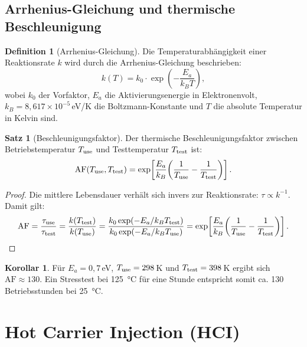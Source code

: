 ﻿\documentclass[a4paper,12pt]{article}
\theoremstyle{definition}
\newtheorem{definition}{Definition}
\newtheorem{satz}{Satz}
\newtheorem{korollar}{Korollar}
\begin{document}
\subsection{Arrhenius-Gleichung und thermische Beschleunigung}

\begin{definition}[Arrhenius-Gleichung]
	Die Temperaturabhängigkeit einer Reaktionsrate $k$ wird durch die
	Arrhenius-Gleichung beschrieben:
	\[
	k(T) = k_0 \cdot \exp\!\left(-\frac{E_a}{k_B T}\right),
	\]
	wobei $k_0$ der Vorfaktor, $E_a$ die Aktivierungsenergie in Elektronenvolt,
	$k_B = 8{,}617 \times 10^{-5}$\,eV/K die Boltzmann-Konstante und
	$T$ die absolute Temperatur in Kelvin sind.
\end{definition}

\begin{satz}[Beschleunigungsfaktor]
	\label{satz:af}
	Der thermische Beschleunigungsfaktor zwischen Betriebstemperatur $T_{\rm use}$
	und Testtemperatur $T_{\rm test}$ ist:
	\[
	\mathrm{AF}(T_{\rm use}, T_{\rm test}) = \exp\!\left[
	\frac{E_a}{k_B}\!\left(\frac{1}{T_{\rm use}} - \frac{1}{T_{\rm test}}\right)
	\right].
	\]
\end{satz}

\begin{proof}
	Die mittlere Lebensdauer verhält sich invers zur Reaktionsrate:
	$\tau \propto k^{-1}$. Damit gilt:
	\[
	\mathrm{AF} = \frac{\tau_{\rm use}}{\tau_{\rm test}}
	= \frac{k(T_{\rm test})}{k(T_{\rm use})}
	= \frac{k_0 \exp(-E_a / k_B T_{\rm test})}{k_0 \exp(-E_a / k_B T_{\rm use})}
	= \exp\!\left[\frac{E_a}{k_B}\!\left(\frac{1}{T_{\rm use}} - \frac{1}{T_{\rm test}}\right)\right].
	\qedhere
	\]
\end{proof}

\begin{korollar}
	Für $E_a = 0{,}7$\,eV, $T_{\rm use} = 298$\,K und $T_{\rm test} = 398$\,K
	ergibt sich $\mathrm{AF} \approx 130$. Ein Stresstest bei 125\, °C für
	eine Stunde entspricht somit ca. 130 Betriebsstunden bei 25\, °C.
\end{korollar}

\section{Hot Carrier Injection (HCI)}
\label{sec:hci}
\end{document}
